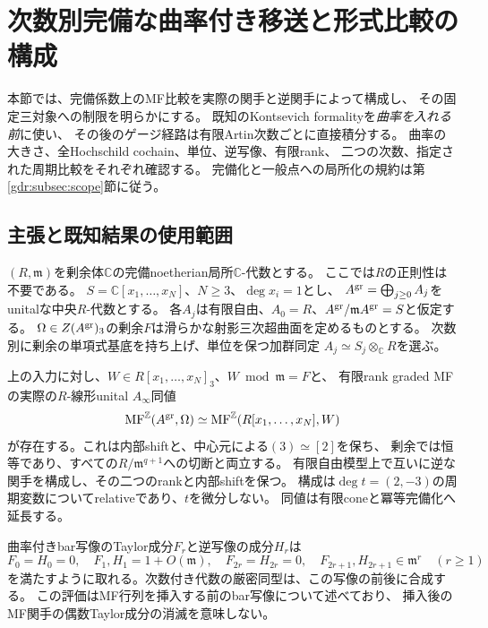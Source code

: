 \section{次数別完備な曲率付き移送と形式比較の構成}
\label{cft:sec:transport}

本節では、完備係数上のMF比較を実際の関手と逆関手によって構成し、
その固定三対象への制限を明らかにする。
既知のKontsevich formalityを\emph{曲率を入れる前}に使い、
その後のゲージ経路は有限Artin次数ごとに直接積分する。
曲率の大きさ、全Hochschild cochain、単位、逆写像、有限rank、
二つの次数、指定された周期比較をそれぞれ確認する。
完備化と一般点への局所化の規約は第\ref{gdr:subsec:scope}節に従う。

\subsection{主張と既知結果の使用範囲}
$(R,\mathfrak m)$を剰余体$\mathbb C$の完備noetherian局所$\mathbb C$-代数とする。
ここでは$R$の正則性は不要である。
$S=\mathbb C[x_1,\ldots,x_N]$、$N\ge3$、$\deg x_i=1$とし、
$A^{\rm gr}=\bigoplus_{j\ge0}A_j$をunitalな中央$R$-代数とする。
各$A_j$は有限自由、$A_0=R$、$A^{\rm gr}/\mathfrak m A^{\rm gr}=S$と仮定する。
$\Omega\in Z(A^{\rm gr})_3$の剰余$F$は滑らかな射影三次超曲面を定めるものとする。
次数別に剰余の単項式基底を持ち上げ、単位を保つ加群同定
$A_j\simeq S_j\otimes_{\mathbb C}R$を選ぶ。

\begin{theorem}
\label{cft:thm:complete}
上の入力に対し、$W\in R[x_1,\ldots,x_N]_3$、$W\bmod\mathfrak m=F$と、
有限rank graded MFの実際の$R$-線形unital $A_\infty$同値
\begin{equation}\label{cft:eq:equivalence}
 \operatorname{MF}^{\mathbb Z}(A^{\rm gr},\Omega)
 \simeq\operatorname{MF}^{\mathbb Z}(R[x_1,\ldots,x_N],W)
\end{equation}
が存在する。これは内部shiftと、中心元による$(3)\simeq[2]$を保ち、
剰余では恒等であり、すべての$R/\mathfrak m^{q+1}$への切断と両立する。
有限自由模型上で互いに逆な関手を構成し、その二つのrankと内部shiftを保つ。
構成は$\deg t=(2,-3)$の周期変数についてrelativeであり、$t$を微分しない。
同値は有限coneと冪等完備化へ延長する。

曲率付きbar写像のTaylor成分$F_r$と逆写像の成分$H_r$は
\begin{equation}\label{cft:eq:bound}
 F_0=H_0=0,\quad F_1,H_1=1+O(\mathfrak m),\quad
 F_{2r}=H_{2r}=0,\quad F_{2r+1},H_{2r+1}\in\mathfrak m^r\quad(r\ge1)
\end{equation}
を満たすように取れる。次数付き代数の厳密同型は、この写像の前後に合成する。
この評価はMF行列を挿入する前のbar写像について述べており、
挿入後のMF関手の偶数Taylor成分の消滅を意味しない。
\end{theorem}

